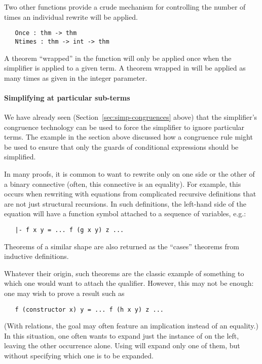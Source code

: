 Two other functions provide a crude mechanism for controlling the
number of times an individual rewrite will be applied.
\begin{hol}
\begin{verbatim}
   Once : thm -> thm
   Ntimes : thm -> int -> thm
\end{verbatim}
\end{hol}
A theorem ``wrapped'' in the  function will only be applied
once when the simplifier is applied to a given term.  A theorem
wrapped in  will be applied as many times as given in the
integer parameter.

\paragraph{Simplifying at particular sub-terms}
We have already seen (Section~\ref{sec:simp-congruences} above) that
the simplifier's congruence technology can be used to force the
simplifier to ignore particular terms.  The example in the section
above discussed how a congruence rule might be used to ensure that
only the guards of conditional expressions should be simplified.

In many proofs, it is common to want to rewrite only on one side or
the other of a binary connective (often, this connective is an
equality).  For example, this occurs when rewriting with equations
from complicated recursive definitions that are not just structural
recursions.  In such definitions, the left-hand side of the equation
will have a function symbol attached to a sequence of variables, e.g.:
\begin{hol}
\begin{verbatim}
   |- f x y = ... f (g x y) z ...
\end{verbatim}
\end{hol}
Theorems of a similar shape are also returned as the ``cases''
theorems from inductive definitions.

Whatever their origin, such theorems are the classic example of
something to which one would want to attach the  qualifier.
However, this may not be enough:  one may wish to prove a result such
as
\begin{hol}
\begin{verbatim}
   f (constructor x) y = ... f (h x y) z ...
\end{verbatim}
\end{hol}
(With relations, the goal may often feature an implication instead of
an equality.)  In this situation, one often wants to expand just the
instance of  on the left, leaving the other occurrence
alone.  Using  will expand only one of them, but without
specifying which one is to be expanded.

